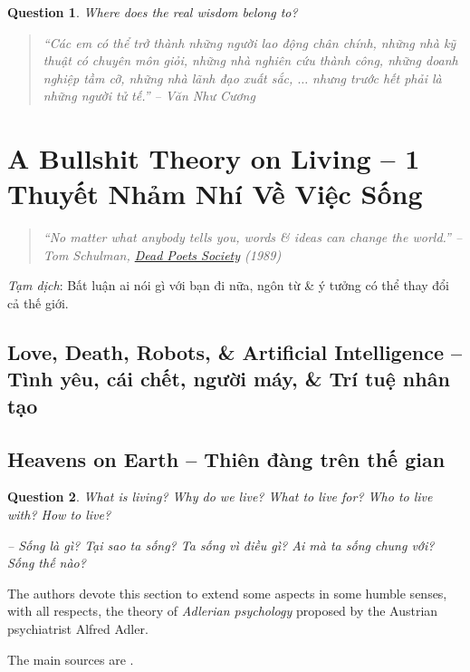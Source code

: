 \documentclass[12pt]{article}
\newtheorem{question}{Question}
\begin{document}
\begin{question}
	Where does the real wisdom belong to?
\end{question}

\begin{quote}\it
	``Các em có thể trở thành những người lao động chân chính, những nhà kỹ thuật có chuyên môn giỏi, những nhà nghiên cứu thành công, những doanh nghiệp tầm cỡ, những nhà lãnh đạo xuất sắc, $\ldots$ nhưng trước hết phải là những người tử tế.'' -- {\sc Văn Như Cương}
\end{quote}


\section{A Bullshit Theory on Living -- 1 Thuyết Nhảm Nhí Về Việc Sống}
\label{sect: bullshit theory on live}

\begin{quote}\it
	``No matter what anybody tells you, words \& ideas can change the world.'' -- {\sc Tom Schulman}, \href{https://www.imdb.com/title/tt0097165}{Dead Poets Society} (1989)
\end{quote}
{\it Tạm dịch}: Bất luận ai nói gì với bạn đi nữa, ngôn từ \& ý tưởng có thể thay đổi cả thế giới.

\subsection{Love, Death, Robots, \& Artificial Intelligence -- Tình yêu, cái chết, người máy, \& Trí tuệ nhân tạo}

\subsection{Heavens on Earth -- Thiên đàng trên thế gian}

\begin{question}
	What is living? Why do we live? What to live for? Who to live with? How to live?
	
	-- Sống là gì? Tại sao ta sống? Ta sống vì điều gì? Ai mà ta sống chung với? Sống thế nào?
\end{question}
The authors devote this section to extend some aspects in some humble senses, with all respects, the theory of {\it Adlerian psychology} proposed by the Austrian psychiatrist {\sc Alfred Adler}.

The main sources are \cite{Adler2013}.
\end{document}
